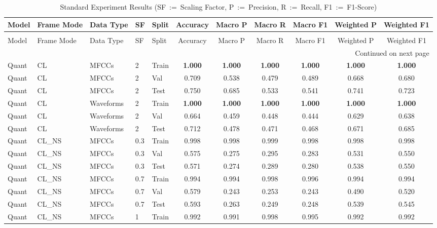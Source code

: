 \begin{landscape}
\begin{longtable}{|l|l|l|l|l|c|c|c|c|c|c|}
\caption{Standard Experiment Results (SF~:=~Scaling Factor, P~:=~Precision, R~:=~Recall, F1~:=~F1-Score)} \label{tab:Standard_Results} \\
\toprule
Model & Frame Mode & Data Type & SF & Split & Accuracy & Macro P & Macro R & Macro F1 & Weighted P & Weighted F1 \\
\midrule
\endfirsthead
\caption[]{Standard Experiment Results (SF~:=~Scaling Factor, P~:=~Precision, R~:=~Recall, F1~:=~F1-Score)} \\
\toprule
Model & Frame Mode & Data Type & SF & Split & Accuracy & Macro P & Macro R & Macro F1 & Weighted P & Weighted F1 \\
\midrule
\endhead
\midrule
\multicolumn{11}{r}{Continued on next page} \\
\midrule
\endfoot
\bottomrule
\endlastfoot
Quant & CL & MFCCs & 2 & Train & \textbf{1.000} & \textbf{1.000} & \textbf{1.000} & \textbf{1.000} & \textbf{1.000} & \textbf{1.000} \\
Quant & CL & MFCCs & 2 & Val & 0.709 & 0.538 & 0.479 & 0.489 & 0.668 & 0.680 \\
Quant & CL & MFCCs & 2 & Test & 0.750 & 0.685 & 0.533 & 0.541 & 0.741 & 0.723 \\
Quant & CL & Waveforms & 2 & Train & \textbf{1.000} & \textbf{1.000} & \textbf{1.000} & \textbf{1.000} & \textbf{1.000} & \textbf{1.000} \\
Quant & CL & Waveforms & 2 & Val & 0.664 & 0.459 & 0.448 & 0.444 & 0.629 & 0.638 \\
Quant & CL & Waveforms & 2 & Test & 0.712 & 0.478 & 0.471 & 0.468 & 0.671 & 0.685 \\
Quant & CL\_NS & MFCCs & 0.3 & Train & 0.998 & 0.998 & 0.999 & 0.998 & 0.998 & 0.998 \\
Quant & CL\_NS & MFCCs & 0.3 & Val & 0.575 & 0.275 & 0.295 & 0.283 & 0.531 & 0.550 \\
Quant & CL\_NS & MFCCs & 0.3 & Test & 0.571 & 0.274 & 0.289 & 0.280 & 0.538 & 0.550 \\
Quant & CL\_NS & MFCCs & 0.7 & Train & 0.994 & 0.994 & 0.998 & 0.996 & 0.994 & 0.994 \\
Quant & CL\_NS & MFCCs & 0.7 & Val & 0.579 & 0.243 & 0.253 & 0.243 & 0.490 & 0.520 \\
Quant & CL\_NS & MFCCs & 0.7 & Test & 0.593 & 0.263 & 0.249 & 0.248 & 0.539 & 0.545 \\
Quant & CL\_NS & MFCCs & 1 & Train & 0.992 & 0.991 & 0.998 & 0.995 & 0.992 & 0.992 \\

\end{longtable}
\end{landscape}
